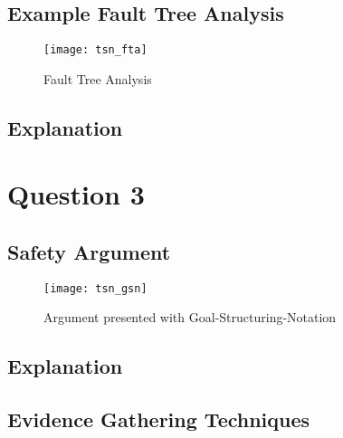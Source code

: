 \subsection{Example Fault Tree Analysis}

\begin{figure}[h]
\centering
\texttt{[image: tsn\_fta]}
\caption{Fault Tree Analysis}
\end{figure}

\subsection{Explanation}

\subsection{}

\section{Question 3}

\subsection{Safety Argument}

\begin{figure}[h]
\centering
\texttt{[image: tsn\_gsn]}
\caption{Argument presented with Goal-Structuring-Notation}
\end{figure}

\subsection{Explanation}

\subsection{Evidence Gathering Techniques}
